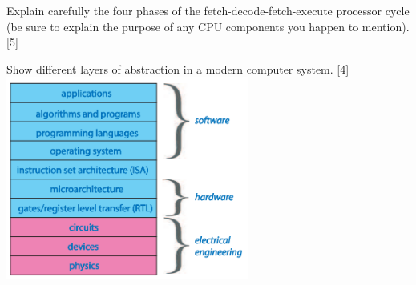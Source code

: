 \documentclass[grid,avery5388]{flashcards}
\begin{document}
\begin{flashcard}[]{Explain carefully the four phases of the fetch-decode-fetch-execute processor cycle (be sure to explain the purpose of any CPU components
you happen to mention). [5]}


\end{flashcard}

\begin{flashcard}[]{Show different layers of abstraction in a modern computer system. [4]}
\includegraphics[width=8cm]{CSys.png}

\end{flashcard}
\end{document}
